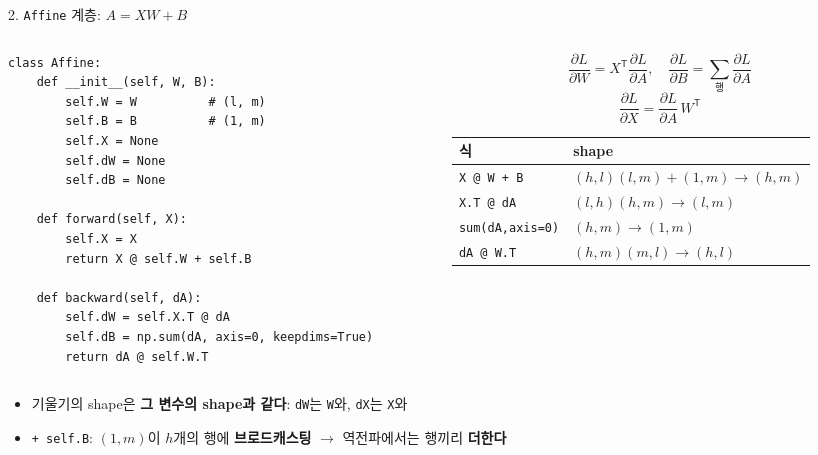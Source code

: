 \documentclass[aspectratio=169,11pt]{beamer}
\newcommand{\T}{^{\mathsf T}}
\newcommand{\pd}[2]{\frac{\partial #1}{\partial #2}}
\newcommand{\code}[1]{\texttt{#1}}
\begin{document}
\begin{frame}[fragile]{2. \code{Affine} 계층: $A=XW+B$}
\begin{columns}[T,onlytextwidth]
\begin{column}{0.55\textwidth}
\begin{lstlisting}
class Affine:
    def __init__(self, W, B):
        self.W = W          # (l, m)
        self.B = B          # (1, m)
        self.X = None
        self.dW = None
        self.dB = None

    def forward(self, X):
        self.X = X
        return X @ self.W + self.B

    def backward(self, dA):
        self.dW = self.X.T @ dA
        self.dB = np.sum(dA, axis=0, keepdims=True)
        return dA @ self.W.T
\end{lstlisting}
\end{column}
\begin{column}{0.42\textwidth}
\small
\[
\pd{L}{W}=X\T\pd{L}{A},\quad
\pd{L}{B}=\sum_{\text{행}}\pd{L}{A}
\]
\[
\pd{L}{X}=\pd{L}{A}\,W\T
\]
\renewcommand{\arraystretch}{1.1}
\scriptsize
\setlength{\tabcolsep}{3pt}
\noindent\begin{adjustbox}{max width=0.95\linewidth}
\begin{tabular}{ll}
\toprule
\textbf{식} & \textbf{shape} \\
\midrule
\code{X @ W + B} & $(h,l)(l,m)+(1,m)\to(h,m)$ \\
\code{X.T @ dA} & $(l,h)(h,m)\to(l,m)$ \\
\code{sum(dA,axis=0)} & $(h,m)\to(1,m)$ \\
\code{dA @ W.T} & $(h,m)(m,l)\to(h,l)$ \\
\bottomrule
\end{tabular}
\end{adjustbox}
\end{column}
\end{columns}
\small
\begin{itemize}
\item 기울기의 shape은 \textbf{그 변수의 shape과 같다}: \code{dW}는 \code{W}와, \code{dX}는 \code{X}와
\item \code{+ self.B}: $(1,m)$이 $h$개의 행에 \textbf{브로드캐스팅} $\to$ 역전파에서는 행끼리 \textbf{더한다}
\end{itemize}
\end{frame}
\end{document}
